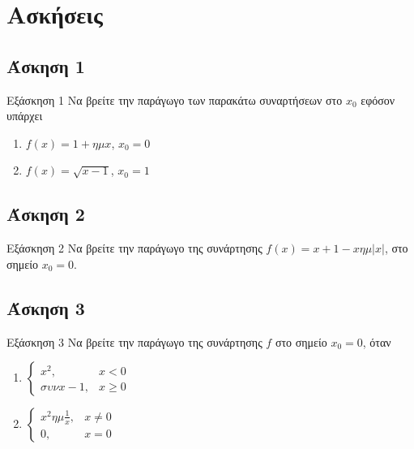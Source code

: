\documentclass[greek]{beamer}
\begin{document}
\section{Ασκήσεις}
\subsection{Άσκηση 1}
\begin{frame}[label=Άσκηση1]{Εξάσκηση 1}
 Να βρείτε την παράγωγο των παρακάτω συναρτήσεων στο $x_0$ εφόσον υπάρχει
 \begin{enumerate}
  \item<1-> $f(x)=1+ημx$, $x_0=0$
  \item<2-> $f(x)=\sqrt{x-1}$, $x_0=1$
 \end{enumerate}

\end{frame}

\subsection{Άσκηση 2}
\begin{frame}[label=Άσκηση2]{Εξάσκηση 2}
 Να βρείτε την παράγωγο της συνάρτησης $f(x)=x+1-xημ|x|$, στο σημείο $x_0=0$.

\end{frame}

\subsection{Άσκηση 3}
\begin{frame}[label=Άσκηση3]{Εξάσκηση 3}
 Να βρείτε την παράγωγο της συνάρτησης $f$ στο σημείο $x_0=0$, όταν
 \begin{enumerate}
  \item<1-> $\begin{cases}
     x^2,    & x<0    \\
     συνx-1, & x\ge 0
    \end{cases}$
  \item<2-> $\begin{cases}
     x^2ημ\frac{1}{x}, & x\ne 0 \\
     0,                & x= 0
    \end{cases}$
 \end{enumerate}

\end{frame}
\end{document}
